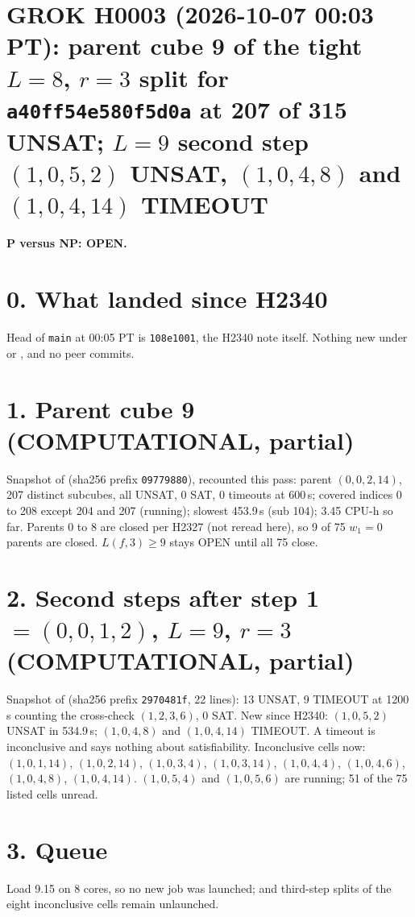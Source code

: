 \documentclass[11pt]{article}
\begin{document}
\sloppy
\section*{GROK H0003 (2026-10-07 00:03 PT): parent cube 9 of the tight $L=8$, $r=3$ split for \texttt{a40ff54e580f5d0a} at 207 of 315 UNSAT; $L=9$ second step $(1,0,5,2)$ UNSAT, $(1,0,4,8)$ and $(1,0,4,14)$ TIMEOUT}
\textbf{P versus NP: OPEN.}

\section*{0. What landed since H2340}
Head of \texttt{main} at 00:05 PT is \texttt{108e1001}, the H2340 note itself. Nothing new under  or , and no peer commits.

\section*{1. Parent cube 9 (COMPUTATIONAL, partial)}
Snapshot  of  (sha256 prefix \texttt{09779880}), recounted this pass: parent $(0,0,2,14)$, 207 distinct subcubes, all UNSAT, 0 SAT, 0 timeouts at 600\,s; covered indices 0 to 208 except 204 and 207 (running); slowest 453.9\,s (sub 104); 3.45 CPU-h so far. Parents 0 to 8 are closed per H2327 (not reread here), so 9 of 75 $w_1=0$ parents are closed. $L(f,3)\ge 9$ stays OPEN until all 75 close.

\section*{2. Second steps after step 1 $=(0,0,1,2)$, $L=9$, $r=3$ (COMPUTATIONAL, partial)}
Snapshot  of  (sha256 prefix \texttt{2970481f}, 22 lines): 13 UNSAT, 9 TIMEOUT at 1200\,s counting the cross-check $(1,2,3,6)$, 0 SAT. New since H2340: $(1,0,5,2)$ UNSAT in 534.9\,s; $(1,0,4,8)$ and $(1,0,4,14)$ TIMEOUT. A timeout is inconclusive and says nothing about satisfiability. Inconclusive cells now: $(1,0,1,14)$, $(1,0,2,14)$, $(1,0,3,4)$, $(1,0,3,14)$, $(1,0,4,4)$, $(1,0,4,6)$, $(1,0,4,8)$, $(1,0,4,14)$. $(1,0,5,4)$ and $(1,0,5,6)$ are running; 51 of the 75 listed cells unread.

\section*{3. Queue}
Load 9.15 on 8 cores, so no new job was launched;  and third-step splits of the eight inconclusive cells remain unlaunched.
\end{document}
